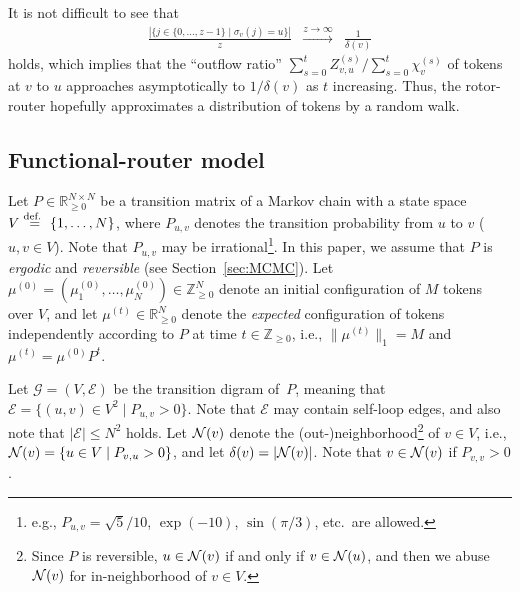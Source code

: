 \documentclass[letter, 11pt]{article}
\newcommand{\defeq}{\stackrel{\mbox{\scriptsize{\normalfont\rmfamily def. }}}{=}}
\newcommand{\1}{\mbox{1}\hspace{-0.25em}\mbox{l}}
\newcommand{\MDG}{\mathcal{G}} \newcommand{\ME}{\mathcal{E}}
\begin{document}
It is not difficult to see that 
\begin{eqnarray*}
 \frac{| \{j \in \{0, \ldots, z-1 \} \mid  \sigma_v(j) = u \} |}{z} 
&\xrightarrow{ z \to \infty}&
 \frac{1}{\delta(v)}
\end{eqnarray*}
  holds, which implies that  
  the ``outflow ratio'' 
   $\sum_{s=0}^t Z_{v, u}^{(s)} / \sum_{s=0}^t \chi^{(s)}_v$ of tokens at $v$ to $u$ 
 approaches asymptotically to $1/\delta(v)$ as $t$ increasing. 
 Thus, the rotor-router hopefully approximates a distribution of tokens by a random walk. 

\subsection{Functional-router model}\label{sec:fr-model}Let $P \in \mathbb{R}_{\geq 0}^{N \times N}$ be 
   a transition matrix of a Markov chain with a state space $V \defeq \{1,\ldots,N\}$, 
  where $P_{u,v}$ denotes the transition probability from $u$ to $v$ ($u, v \in V$). 
 Note that $P_{u,v}$ may be irrational\footnote{  
     e.g., $P_{u,v} = \sqrt{5}/10$, $\exp(-10)$, $\sin(\pi/3)$, etc.~are allowed.
  }.
 In this paper, we assume that $P$ is {\em ergodic} and {\em reversible} (see Section~\ref{sec:MCMC}). 
Let $\mu^{(0)} = (\mu^{(0)}_1, \ldots, \mu^{(0)}_N) \in \mathbb{Z}_{\geq 0}^N$ 
   denote an initial configuration of $M$ tokens over $V$, and 
 let $\mu^{(t)} \in \mathbb{R}_{\geq 0}^N$ 
   denote the {\em expected} configuration of tokens 
   independently according to $P$ at time $t \in \mathbb{Z}_{\geq 0}$, 
   i.e., $\|\mu^{(t)}\|_1 = M$ and $ \mu^{(t)} =  \mu^{(0)} P^t$. 

Let $\MDG=(V, \ME)$ be the transition digram of~$P$, 
  meaning that $\ME = \{(u, v) \in V^2 \mid P_{u, v} > 0\}$. 
 Note that $\ME$ may contain self-loop edges, and also 
 note that $|\ME| \leq N^2$ holds. 
 Let ${\cal N}(v)$ denote 
  the (out-)neighborhood\footnote{
 Since $P$ is reversible, 
  $u \in {\cal N}(v)$ if and only if $v \in {\cal N}(u)$, and then 
  we abuse ${\cal N}(v)$ for in-neighborhood of $v \in V$. 
} of $v \in V$, 
  i.e., ${\cal N}(v) = \{ u \in V \mid P_{v, u}>0 \}$, and  
 let $\delta(v)=|{\cal N}(v)|$. 
 Note that $v \in {\cal N}(v)$ if $P_{v,v} > 0$. 
\end{document}
